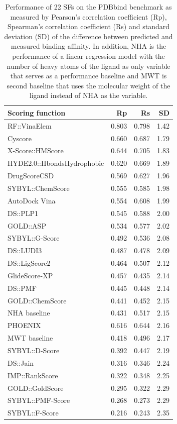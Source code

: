 \begin{table}
\caption{Performance of 22 SFs on the PDBbind benchmark as measured by Pearson's correlation coefficient (Rp), Spearman's correlation coefficient (Rs) and standard deviation (SD) of the difference between predicted and measured binding affinity. In addition, NHA is the performance of a linear regression model with the number of heavy atoms of the ligand as only variable that serves as a performance baseline and MWT is second baseline that uses the molecular weight of the ligand instead of NHA as the variable.}
\label{rfscore3:trn1105tst195}
\begin{tabular}{lrrr}
\hline
Scoring function & Rp & Rs & SD\\
\hline
RF::VinaElem               & 0.803 & 0.798 & 1.42\\
Cyscore                    & 0.660 & 0.687 & 1.79\\
X-Score::HMScore           & 0.644 & 0.705 & 1.83\\
HYDE2.0::HbondsHydrophobic & 0.620 & 0.669 & 1.89\\
DrugScoreCSD               & 0.569 & 0.627 & 1.96\\
SYBYL::ChemScore           & 0.555 & 0.585 & 1.98\\
AutoDock Vina              & 0.554 & 0.608 & 1.99\\
DS::PLP1                   & 0.545 & 0.588 & 2.00\\
GOLD::ASP                  & 0.534 & 0.577 & 2.02\\
SYBYL::G-Score             & 0.492 & 0.536 & 2.08\\
DS::LUDI3                  & 0.487 & 0.478 & 2.09\\
DS::LigScore2              & 0.464 & 0.507 & 2.12\\
GlideScore-XP              & 0.457 & 0.435 & 2.14\\
DS::PMF                    & 0.445 & 0.448 & 2.14\\
GOLD::ChemScore            & 0.441 & 0.452 & 2.15\\
NHA baseline               & 0.431 & 0.517 & 2.15\\
PHOENIX                    & 0.616 & 0.644 & 2.16\\
MWT baseline               & 0.418 & 0.496 & 2.17\\
SYBYL::D-Score             & 0.392 & 0.447 & 2.19\\
DS::Jain                   & 0.316 & 0.346 & 2.24\\
IMP::RankScore             & 0.322 & 0.348 & 2.25\\
GOLD::GoldScore            & 0.295 & 0.322 & 2.29\\
SYBYL::PMF-Score           & 0.268 & 0.273 & 2.29\\
SYBYL::F-Score             & 0.216 & 0.243 & 2.35\\
\hline
\end{tabular}
\end{table}

